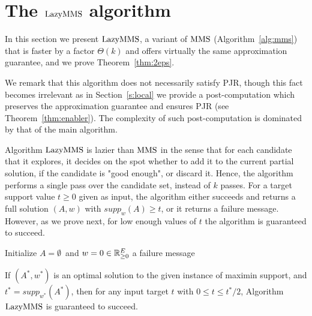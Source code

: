 \section{The $\lazy$ algorithm}\label{s:lazymms}

In this section we present $\lazy$, a variant of $\operatorname{MMS}$ (Algorithm~\ref{alg:mms}) that is faster by a factor $\Theta(k)$ and offers virtually the same approximation guarantee, and we prove Theorem~\ref{thm:2eps}.

We remark that this algorithm does not necessarily satisfy PJR, though this fact becomes irrelevant as in Section~\ref{s:local} we provide a post-computation which preserves the approximation guarantee and ensures PJR (see Theorem~\ref{thm:enabler}). The complexity of such post-computation is dominated by that of the main algorithm.

Algorithm $\lazy$ is lazier than $\operatorname{MMS}$ in the sense that for each candidate that it explores, it decides on the spot whether to add it to the current partial solution, if the candidate is "good enough", or discard it. 
Hence, the algorithm performs a single pass over the candidate set, instead of $k$ passes. 
For a target support value $t\geq 0$ given as input, the algorithm either succeeds and returns a full solution $(A,w)$ with $supp_w(A)\geq t$, or it returns a failure message. 
However, as we prove next, for low enough values of $t$ the algorithm is guaranteed to succeed.

\begin{algorithm}[htb]\label{alg:lazy}
\SetAlgoLined
{}
Initialize $A=\emptyset$\ and $w=0\in\mathbb{R}_{\geq 0}^E$\;
\Return a failure message\;
\caption{$\lazy$}
\end{algorithm}

\begin{lemma}\label{lem:success}
If $(A^*, w^*)$ is an optimal solution to the given instance of maximin support, and $t^*=supp_{w^*}(A^*)$, then for any input target $t$ with $0\leq t\leq t^*/2$, Algorithm $\lazy$ is guaranteed to succeed.
\end{lemma}

